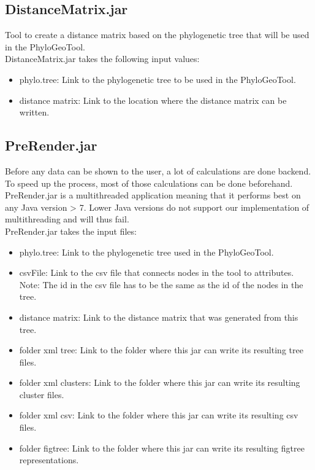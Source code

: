 \documentclass[a4paper, 11pt]{article} %
\begin{document}
\subsection{DistanceMatrix.jar}
Tool to create a distance matrix based on the phylogenetic tree that will be used in the PhyloGeoTool.
\\
DistanceMatrix.jar takes the following input values:
\begin{itemize}
\item phylo.tree: Link to the phylogenetic tree to be used in the PhyloGeoTool.
\item distance matrix: Link to the location where the distance matrix can be written.
\end{itemize}

\subsection{PreRender.jar}
Before any data can be shown to the user, a lot of calculations are done backend. To speed up the process, most of those calculations can be done beforehand.
\\
PreRender.jar is a multithreaded application meaning that it performs best on any Java version > 7. Lower Java versions do not support our implementation of multithreading and will thus fail.
\\
PreRender.jar takes the input files:
\begin{itemize}
\item phylo.tree: Link to the phylogenetic tree used in the PhyloGeoTool.
\item csvFile: Link to the csv file that connects nodes in the tool to attributes. Note: The id in the csv file has to be the same as the id of the nodes in the tree.
\item distance matrix: Link to the distance matrix that was generated from this tree.
\item folder xml tree: Link to the folder where this jar can write its resulting tree files.
\item folder xml clusters: Link to the folder where this jar can write its resulting cluster files.
\item folder xml csv: Link to the folder where this jar can write its resulting csv files.
\item folder figtree: Link to the folder where this jar can write its resulting figtree representations.
\end{itemize}

\end{document}

